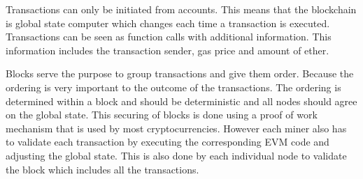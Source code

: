 \documentclass[a4paper]{article}
\begin{document}
Transactions can only be initiated from accounts. This means that the blockchain is global state computer which changes each time a transaction is executed. Transactions can be seen as function calls with additional information. This information includes the transaction sender, gas price and amount of ether.\par
Blocks serve the purpose to group transactions and give them order. Because the ordering is very important to the outcome of the transactions. The ordering is determined within a block and should be deterministic and all nodes should agree on the global state. This securing of blocks is done using a proof of work mechanism that is used by most cryptocurrencies. However each miner also has to validate each transaction by executing the corresponding EVM code and adjusting the global state. This is also done by each individual node to validate the block which includes all the transactions.
\end{document}
